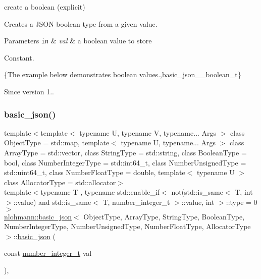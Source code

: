 create a boolean (explicit) 

Creates a J\+S\+ON boolean type from a given value.


\begin{DoxyParams}[1]{Parameters}
\mbox{\tt in}  & {\em val} & a boolean value to store\\
\hline
\end{DoxyParams}
Constant.

\{The example below demonstrates boolean values.,basic\+\_\+json\+\_\+\+\_\+boolean\+\_\+t\}

\begin{DoxySince}{Since}
version 1.. 
\end{DoxySince}
\hypertarget{classnlohmann_1_1basic__json_a0d838bc7ffca6017f51167e0a8ffd9b6}{}\label{classnlohmann_1_1basic__json_a0d838bc7ffca6017f51167e0a8ffd9b6} 
\subsubsection{\texorpdfstring{basic\+\_\+json()}{basic\_json()}\hspace{0.1cm}{\footnotesize\ttfamily [11/23]}}
{\footnotesize\ttfamily template$<$template$<$ typename U, typename V, typename... Args $>$ class Object\+Type = std\+::map, template$<$ typename U, typename... Args $>$ class Array\+Type = std\+::vector, class String\+Type  = std\+::string, class Boolean\+Type  = bool, class Number\+Integer\+Type  = std\+::int64\+\_\+t, class Number\+Unsigned\+Type  = std\+::uint64\+\_\+t, class Number\+Float\+Type  = double, template$<$ typename U $>$ class Allocator\+Type = std\+::allocator$>$ \\
template$<$typename T , typename std\+::enable\+\_\+if$<$ not(std\+::is\+\_\+same$<$ T, int $>$\+::value) and std\+::is\+\_\+same$<$ T, number\+\_\+integer\+\_\+t $>$\+::value, int $>$\+::type  = 0$>$ \\
\hyperlink{classnlohmann_1_1basic__json}{nlohmann\+::basic\+\_\+json}$<$ Object\+Type, Array\+Type, String\+Type, Boolean\+Type, Number\+Integer\+Type, Number\+Unsigned\+Type, Number\+Float\+Type, Allocator\+Type $>$\+::\hyperlink{classnlohmann_1_1basic__json}{basic\+\_\+json} (\begin{DoxyParamCaption}\item[{const \hyperlink{classnlohmann_1_1basic__json_ac4b10b2364f26ce47bdb9a413ff04a59}{number\+\_\+integer\+\_\+t}}]{val }\end{DoxyParamCaption})\hspace{0.3cm}{\ttfamily [inline]}, {\ttfamily [noexcept]}}



